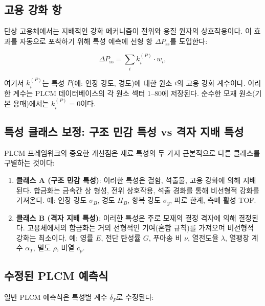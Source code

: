 \documentclass[12pt,a4paper]{article}
\begin{document}
	\subsection{고용 강화 항}
	\label{subsec:ss-term}
	
	단상 고용체에서는 지배적인 강화 메커니즘이 전위와 용질 원자의 상호작용이다. 이 효과를 자동으로 포착하기 위해 특성 예측에 선형 항 \(\Delta P_{\text{ss}}\)를 도입한다:
	
	\begin{equation}
		\Delta P_{\text{ss}} = \sum_i k_i^{(P)} \cdot w_i,
		\label{eq:ss-term}
	\end{equation}
	
	여기서 \(k_i^{(P)}\)는 특성 \(P\)(예: 인장 강도, 경도)에 대한 원소 \(i\)의 고용 강화 계수이다. 이러한 계수는 PLCM 데이터베이스의 각 원소 섹터 1–80에 저장된다. 순수한 모재 원소(기본 용매)에서는 \(k_i^{(P)} = 0\)이다.
	
	\subsection{특성 클래스 보정: 구조 민감 특성 vs 격자 지배 특성}
	\label{subsec:property-class-calibration}
	
	PLCM 프레임워크의 중요한 개선점은 재료 특성의 두 가지 근본적으로 다른 클래스를 구별하는 것이다:
	
	\begin{enumerate}
		\item \textbf{클래스 A (구조 민감 특성)}: 이러한 특성은 결함, 석출물, 고용 강화에 의해 지배된다. 합금화는 금속간 상 형성, 전위 상호작용, 석출 경화를 통해 비선형적 강화를 가져온다. 예: 인장 강도 \(\sigma_B\), 경도 \(H_B\), 항복 강도 \(\sigma_y\), 피로 한계, 촉매 활성 TOF.
		
		\item \textbf{클래스 B (격자 지배 특성)}: 이러한 특성은 주로 모재의 결정 격자에 의해 결정된다. 고용체에서의 합금화는 거의 선형적인 기여(혼합 규칙)를 가져오며 비선형적 강화는 최소이다. 예: 영률 \(E\), 전단 탄성률 \(G\), 푸아송 비 \(\nu\), 열전도율 \(\lambda\), 열팽창 계수 \(\alpha_T\), 밀도 \(\rho\), 비열 \(c_p\).
	\end{enumerate}
	
	\subsection{수정된 PLCM 예측식}
	
	일반 PLCM 예측식은 특성별 계수 \(\delta_P\)로 수정된다:
	
\end{document}
